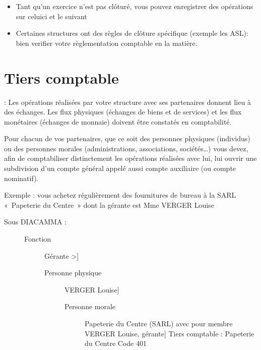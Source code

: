 \documentclass[a4paper,10pt,oneside,french]{sphinxmanual}
\begin{document}
\sphinxAtStartPar
{}
\begin{itemize}
\item {} 
\sphinxAtStartPar
Tant qu’un exercice n’est pas clôturé, vous pouvez enregistrer des opérations sur celui\sphinxhyphen{}ci et le suivant

\item {} 
\sphinxAtStartPar
Certaines structures ont des règles de clôture spécifique (exemple les ASL): bien verifier votre règlementation comptable en la matière.

\end{itemize}


\section{Tiers comptable}
\label{\detokenize{accounting/third:tiers-comptable}}\label{\detokenize{accounting/third::doc}}
\sphinxAtStartPar
{} :
Les opérations réalisées par votre structure avec ses partenaires donnent lieu à des échanges. Les flux physiques (échanges de biens et de services) et les flux monétaires (échanges de monnaie) doivent être constatés en comptabilité.

\sphinxAtStartPar
Pour chacun de vos partenaires, que ce soit des personnes physiques (individus) ou des personnes morales (administrations, associations, sociétés…) vous devez, afin de comptabiliser distinctement les opérations réalisées avec lui, lui ouvrir une subdivision d’un compte général appelé aussi compte auxiliaire (ou compte nominatif).

\sphinxAtStartPar
Exemple : vous achetez régulièrement des fournitures de bureau à la SARL « Papeterie du Centre » dont la gérante est Mme VERGER Louise
\begin{description}
\item[{Sous DIACAMMA :}] \leavevmode\begin{description}
\item[{Fonction}] \leavevmode{[}Gérante                                  \textendash{}\textgreater{}{]}\begin{description}
\item[{Personne physique}] \leavevmode{[}VERGER Louise{]}\begin{description}
\item[{Personne morale}] \leavevmode{[}Papeterie du Centre (SARL) avec pour membre VERGER Louise, gérante{]}
\sphinxAtStartPar
Tiers comptable : Papeterie du Centre \sphinxhyphen{} Code 401

\end{description}

\end{description}

\end{description}

\end{description}
\end{document}
